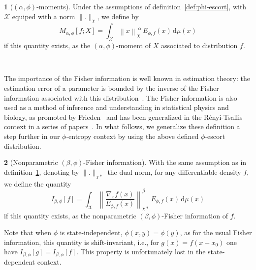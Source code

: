 \documentclass[english,sort&compress]{elsarticle}
\theoremstyle{definition}
\newtheorem{defn}{\protect\definitionname}
\theoremstyle{plain}
\theoremstyle{plain}
\providecommand{\definitionname}{Definition}
\def\dmu{\mathrm{d}\mu}
\def\X{\mathcal{X}}
\begin{document}
\begin{defn}[$(\alpha,\phi)$-moments]\label{def:phi-moment}
  Under  the assumptions of  definition~\ref{def:phi-escort}, with  $\X$ equiped
  with a norm $\|.\|_\chi$, we define by
  \begin{equation}\label{eq:phi-moment}
  M_{\alpha,\phi}[f;X] = \int_\X \left\| x \right\|_\chi^{\: \alpha} \,
  E_{\phi,f}(x) \, \dmu(x)
  \end{equation}
  if this  quantity exists, as  the $(\alpha,\phi)$-moment of $X$  associated to
  distribution $f$.
\end{defn}
%


\

The importance of the Fisher information is well known in estimation theory: the
estimation  error  of a  parameter  is  bounded by  the  inverse  of the  Fisher
information  associated  with  this  distribution~\cite{Kay93,  CovTho06}.   The
Fisher information  is also used as  a method of inference  and understanding in
statistical  physics and biology,  as promoted  by Frieden~\cite{Fri04}  and has
been   generalized   in   the   R\'enyi-Tsallis   context   in   a   series   of
papers~\cite{Ham78,   ChimPen00,   CasChi02,   LutYan05,  LutLv12,   Ber12:06_1,
  Ber12:06_2, Ber13}.   In what follows,  we generalize these definition  a step
further in our  $\phi$-entropy context by using the  above defined $\phi$-escort
distribution.

\begin{defn}[Nonparametric                                  $(\beta,\phi)$-Fisher
  information]\label{def:np-phi-Fisher}
  With the  same assumption  as in definition~\ref{def:phi-moment},  denoting by
  $\|.\|_{\chi*}$ the dual  norm, for any differentiable density  $f$, we define
  the quantity
  \begin{equation}\label{eq:np-phi-Fisher}
    I_{\beta,\phi}[f] = \int_\X \left\| \frac{\nabla_x f(x)}{E_{\phi,f}(x)}
    \right\|_{\chi*}^\beta \, E_{\phi,f}(x) \, \dmu(x)
  \end{equation}
  if   this  quantity   exists,  as   the   nonparametric  $(\beta,\phi)$-Fisher
  information of $f$.
\end{defn}
%
Note that  when $\phi$ is state-independent,  $\phi(x,y) = \phi(y)$,  as for the
usual Fisher information,  this quantity is shift-invariant, i.e.,  for $g(x) =
f(x-x_0)$  one have  $I_{\beta,\phi}[g] =  I_{\beta,\phi}[f]$. This  property is
unfortunately lost in the state-dependent context.
\end{document}
